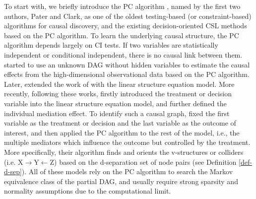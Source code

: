 To start with, we briefly introduce the \acrfull{PC} algorithm \citep{spirtes2000causation}, named by the first two authors, Pater and Clark, 
as one of the oldest testing-based (or constraint-based) algorithms for causal discovery, and the existing decision-oriented \acrshort{CSL} methods based on the \acrfull{PC} algorithm. 
To learn the underlying causal structure, the PC algorithm depends largely on \acrfull{CI} tests. If two variables are statistically independent or conditional independent, there is no causal link between them.  
\citet{maathuis2009estimating} started to use an unknown \acrshort{DAG} without hidden variables to estimate the causal effects from the high-dimensional observational data based on the \acrshort{PC} algorithm. Later, \citet{nandy2017estimating} extended the work of \citet{maathuis2009estimating} with the linear structure equation model. More recently, following these works, \citet{chakrabortty2018inference} firstly introduced the treatment or decision variable into the linear structure equation model, and further 
defined the individual mediation effect. To identify such a causal graph,  \citet{chakrabortty2018inference} fixed the first variable as the treatment or decision and the last variable as the outcome of interest, and then applied the PC algorithm to the rest of the model, i.e., the multiple mediators which influence the outcome but controlled by the treatment. More specifically, their algorithm finds and orients the v-structures or colliders (i.e. $\mathrm{X} \rightarrow \mathrm{Y} \leftarrow \mathrm{Z}$) based on the d-separation set of node pairs (see Definition \ref{def-d-sep}). 
All of these models rely on the PC algorithm to search the Markov equivalence class of the partial \acrshort{DAG}, and usually require strong sparsity and normality assumptions due to the computational limit. 




 


